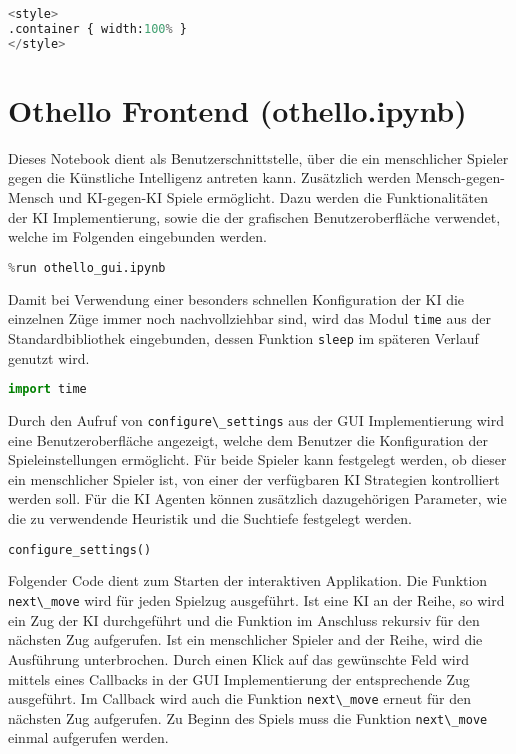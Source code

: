 \begin{lstlisting}[language=Python]
%%HTML
<style>
.container { width:100% }
</style>
\end{lstlisting}

\hypertarget{othello-frontend-othello.ipynb}{%
\section{Othello Frontend
(othello.ipynb)}\label{othello-frontend-othello.ipynb}}

Dieses Notebook dient als Benutzerschnittstelle, über die ein
menschlicher Spieler gegen die Künstliche Intelligenz antreten kann.
Zusätzlich werden Mensch-gegen-Mensch und KI-gegen-KI Spiele ermöglicht.
Dazu werden die Funktionalitäten der KI Implementierung, sowie die der
grafischen Benutzeroberfläche verwendet, welche im Folgenden eingebunden
werden.

\begin{lstlisting}[language=Python]
%run othello_ai.ipynb
%run othello_gui.ipynb
\end{lstlisting}

Damit bei Verwendung einer besonders schnellen Konfiguration der KI die
einzelnen Züge immer noch nachvollziehbar sind, wird das Modul
\passthrough{\lstinline!time!} aus der Standardbibliothek eingebunden,
dessen Funktion \passthrough{\lstinline!sleep!} im späteren Verlauf
genutzt wird.

\begin{lstlisting}[language=Python]
import time
\end{lstlisting}

Durch den Aufruf von \passthrough{\lstinline!configure\_settings!} aus
der GUI Implementierung wird eine Benutzeroberfläche angezeigt, welche
dem Benutzer die Konfiguration der Spieleinstellungen ermöglicht. Für
beide Spieler kann festgelegt werden, ob dieser ein menschlicher Spieler
ist, von einer der verfügbaren KI Strategien kontrolliert werden soll.
Für die KI Agenten können zusätzlich dazugehörigen Parameter, wie die zu
verwendende Heuristik und die Suchtiefe festgelegt werden.

\begin{lstlisting}[language=Python]
configure_settings()
\end{lstlisting}

Folgender Code dient zum Starten der interaktiven Applikation. Die
Funktion \passthrough{\lstinline!next\_move!} wird für jeden Spielzug
ausgeführt. Ist eine KI an der Reihe, so wird ein Zug der KI
durchgeführt und die Funktion im Anschluss rekursiv für den nächsten Zug
aufgerufen. Ist ein menschlicher Spieler and der Reihe, wird die
Ausführung unterbrochen. Durch einen Klick auf das gewünschte Feld wird
mittels eines Callbacks in der GUI Implementierung der entsprechende Zug
ausgeführt. Im Callback wird auch die Funktion
\passthrough{\lstinline!next\_move!} erneut für den nächsten Zug
aufgerufen. Zu Beginn des Spiels muss die Funktion
\passthrough{\lstinline!next\_move!} einmal aufgerufen werden.

